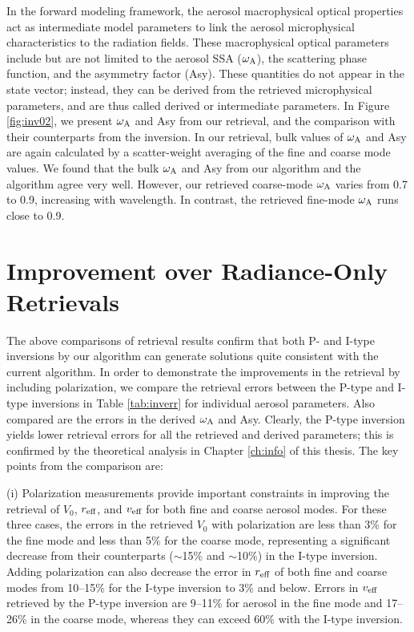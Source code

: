 In the forward modeling framework, the aerosol macrophysical optical properties
act as intermediate model parameters to link the aerosol microphysical
characteristics to the radiation fields. These macrophysical optical parameters
include but are not limited to the aerosol SSA ($\omega_\text{A}$), the scattering phase
function, and the asymmetry factor (Asy). These quantities do not appear in the
state vector; instead, they can be derived from the retrieved microphysical
parameters, and are thus called derived or intermediate parameters. In Figure
\ref{fig:inv02}, we present $\omega_\text{A}$ and Asy from our retrieval, and the 
comparison with their counterparts from the \Dub inversion. In our retrieval,
bulk values of $\omega_\text{A}$ and Asy are again calculated by a scatter-weight 
averaging of the fine and coarse mode values. We found that the bulk $\omega_\text{A}$ 
and Asy from our algorithm and the \Dub algorithm agree very well. 
However, our retrieved coarse-mode $\omega_\text{A}$ varies from 0.7 to 0.9, increasing
with wavelength. In contrast, the retrieved fine-mode $\omega_\text{A}$ runs close to 0.9. 

\section{Improvement over Radiance-Only Retrievals} \label{sec:inv1}

The above comparisons of retrieval results confirm that both P- and I-type
inversions by our algorithm can generate solutions quite consistent with the
current \Dub algorithm. In order to demonstrate the improvements in the
retrieval by including polarization, we compare the retrieval errors between
the P-type and I-type inversions in Table \ref{tab:inverr} for individual aerosol parameters.
Also compared are the errors in the derived $\omega_\text{A}$ and Asy. Clearly, the P-type
inversion yields lower retrieval errors for all the retrieved and derived
parameters; this is confirmed by the theoretical analysis in Chapter
\ref{ch:info} of this thesis. The key points from the comparison are:

(i) Polarization measurements provide important constraints in improving the
retrieval of $V_0$, $r_\text{eff}$, and $v_\text{eff}$ for both fine and coarse aerosol modes. For
these three cases, the errors in the retrieved $V_0$ with polarization are less
than 3\% for the fine mode and less than 5\% for the coarse mode, representing a
significant decrease from their counterparts ($\sim$15\% and $\sim$10\%) in the I-type
inversion. Adding polarization can also decrease the error in $r_\text{eff}$ of both
fine and coarse modes from 10--15\% for the I-type inversion to 3\% and below.
Errors in $v_\text{eff}$ retrieved by the P-type inversion are 9--11\% for aerosol in the
fine mode and 17--26\% in the coarse mode, whereas they can exceed 60\% with the
I-type inversion.

